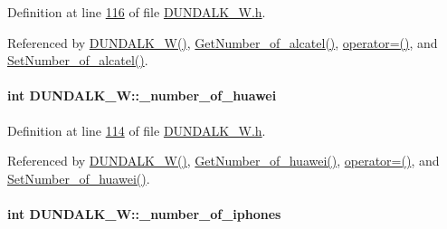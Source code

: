 Definition at line \hyperlink{_d_u_n_d_a_l_k___w_8h_source_l00116}{116} of file \hyperlink{_d_u_n_d_a_l_k___w_8h_source}{D\+U\+N\+D\+A\+L\+K\+\_\+\+W.\+h}.



Referenced by \hyperlink{_d_u_n_d_a_l_k___w_8h_source_l00024}{D\+U\+N\+D\+A\+L\+K\+\_\+\+W()}, \hyperlink{_d_u_n_d_a_l_k___w_8cpp_source_l00073}{Get\+Number\+\_\+of\+\_\+alcatel()}, \hyperlink{_d_u_n_d_a_l_k___w_8h_source_l00075}{operator=()}, and \hyperlink{_d_u_n_d_a_l_k___w_8cpp_source_l00069}{Set\+Number\+\_\+of\+\_\+alcatel()}.

\paragraph[{\texorpdfstring{\+\_\+number\+\_\+of\+\_\+huawei}{_number_of_huawei}}]{\setlength{\rightskip}{0pt plus 5cm}int D\+U\+N\+D\+A\+L\+K\+\_\+\+W\+::\+\_\+number\+\_\+of\+\_\+huawei\hspace{0.3cm}{\ttfamily [private]}}\hypertarget{class_d_u_n_d_a_l_k___w_a84781068676dee44cb4654706d8fec51_a84781068676dee44cb4654706d8fec51}{}\label{class_d_u_n_d_a_l_k___w_a84781068676dee44cb4654706d8fec51_a84781068676dee44cb4654706d8fec51}


Definition at line \hyperlink{_d_u_n_d_a_l_k___w_8h_source_l00114}{114} of file \hyperlink{_d_u_n_d_a_l_k___w_8h_source}{D\+U\+N\+D\+A\+L\+K\+\_\+\+W.\+h}.



Referenced by \hyperlink{_d_u_n_d_a_l_k___w_8h_source_l00024}{D\+U\+N\+D\+A\+L\+K\+\_\+\+W()}, \hyperlink{_d_u_n_d_a_l_k___w_8cpp_source_l00089}{Get\+Number\+\_\+of\+\_\+huawei()}, \hyperlink{_d_u_n_d_a_l_k___w_8h_source_l00075}{operator=()}, and \hyperlink{_d_u_n_d_a_l_k___w_8cpp_source_l00085}{Set\+Number\+\_\+of\+\_\+huawei()}.

\paragraph[{\texorpdfstring{\+\_\+number\+\_\+of\+\_\+iphones}{_number_of_iphones}}]{\setlength{\rightskip}{0pt plus 5cm}int D\+U\+N\+D\+A\+L\+K\+\_\+\+W\+::\+\_\+number\+\_\+of\+\_\+iphones\hspace{0.3cm}{\ttfamily [private]}}\hypertarget{class_d_u_n_d_a_l_k___w_a82b528f661644166d93a5209524b4543_a82b528f661644166d93a5209524b4543}{}\label{class_d_u_n_d_a_l_k___w_a82b528f661644166d93a5209524b4543_a82b528f661644166d93a5209524b4543}


